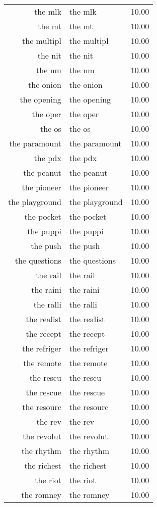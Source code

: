 \begin{table}[ht]
\begin{tabular}{rlr}
  the mlk & the mlk & 10.00 \\ 
  the mt & the mt & 10.00 \\ 
  the multipl & the multipl & 10.00 \\ 
  the nit & the nit & 10.00 \\ 
  the nm & the nm & 10.00 \\ 
  the onion & the onion & 10.00 \\ 
  the opening & the opening & 10.00 \\ 
  the oper & the oper & 10.00 \\ 
  the os & the os & 10.00 \\ 
  the paramount & the paramount & 10.00 \\ 
  the pdx & the pdx & 10.00 \\ 
  the peanut & the peanut & 10.00 \\ 
  the pioneer & the pioneer & 10.00 \\ 
  the playground & the playground & 10.00 \\ 
  the pocket & the pocket & 10.00 \\ 
  the puppi & the puppi & 10.00 \\ 
  the push & the push & 10.00 \\ 
  the questions & the questions & 10.00 \\ 
  the rail & the rail & 10.00 \\ 
  the raini & the raini & 10.00 \\ 
  the ralli & the ralli & 10.00 \\ 
  the realist & the realist & 10.00 \\ 
  the recept & the recept & 10.00 \\ 
  the refriger & the refriger & 10.00 \\ 
  the remote & the remote & 10.00 \\ 
  the rescu & the rescu & 10.00 \\ 
  the rescue & the rescue & 10.00 \\ 
  the resourc & the resourc & 10.00 \\ 
  the rev & the rev & 10.00 \\ 
  the revolut & the revolut & 10.00 \\ 
  the rhythm & the rhythm & 10.00 \\ 
  the richest & the richest & 10.00 \\ 
  the riot & the riot & 10.00 \\ 
  the romney & the romney & 10.00 \\ 

\end{tabular}
\end{table}
